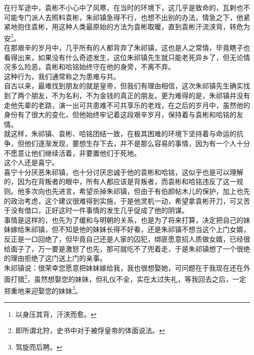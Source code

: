 \begin{multicols}{\theparacolNo}
在行军途中，袁彬不小心中了风寒，在当时的环境下，这几乎是致命的，瓦剌也不可能专门派人去照料袁彬，朱祁镇急得不行，也想不出别的办法，情急之下，他紧紧地抱住袁彬，用这种人类最原始的方法为袁彬取暖，直到袁彬汗流浃背，转危为安\footnote{以身压其背，汗浃而愈。}。\\

在那艰辛的岁月中，几乎所有的人都背弃了朱祁镇，这也是人之常情，毕竟瞎子也看得出来，如果没有什么奇迹发生，这位朱祁镇先生就只能老死异乡了，但无论情况多么险恶，袁彬和哈铭始终守在他的身旁，不离不弃。\\

这种行为，我们通常称之为患难与共。\\

自古以来，最难找到朋友的就是皇帝，但我们有理由相信，这次朱祁镇先生确实找到了两个朋友，不为名利，不为金钱的真正的朋友。更为难得的是，朱祁镇并没有走他先辈的老路，演一出可共患难不可共享乐的老戏，在之后的岁月中，虽然他的身份有了很大的变化，但他始终牢记着这段艰辛岁月，保持着与袁彬和哈铭的友情。\\

就这样，朱祁镇、袁彬、哈铭团结一致，在极其困难的环境下坚持着与命运的抗争，但他们逐渐发现，要想生存下去，并不是那么容易的事情，因为有一个人十分不愿意让他们继续活着，非要置他们于死地。\\

这个人还是喜宁。\\

喜宁十分厌恶朱祁镇，也十分讨厌忠诚于他的袁彬和哈铭，这似乎也是可以理解的，因为在背叛者的眼中，所有人都应该是背叛者，而袁彬和哈铭违反了这一规则。他多次向也先进言，希望杀掉朱祁镇，但由于有伯颜帖木儿的保护，加上也先的政治考虑，这个建议很难得到实施，于是他灵机一动，希望拿袁彬开刀，可又苦于没有借口，正好这时一件事情的发生几乎促成了他的阴谋。\\

事情是这样的，也先为了缓和与明朝的关系，也是为了将来打算，决定把自己的妹妹嫁给朱祁镇，但不知是他的妹妹长得不好看，还是朱祁镇不想当这个上门女婿，反正是一口回绝了，但毕竟自己还是人家的囚犯，绑匪愿意招人质做女婿，已经很给面子了，万一要是激怒了也先，那可就吃不了兜着走，于是朱祁镇想了一个很绝的理由拒绝了这门送上门的亲事。\\

朱祁镇说：很荣幸您愿意把妹妹嫁给我，我也很想娶她，可问题在于我现在还在外面打猎\footnote{即所谓北狩，史书中对于被俘皇帝的体面说法。}，虽然想娶您的妹妹，但礼仪不全，实在太过失礼，等我回去之后，一定郑重地来迎娶您的妹妹\footnote{驾旋而后聘。}。\\


\end{multicols}
